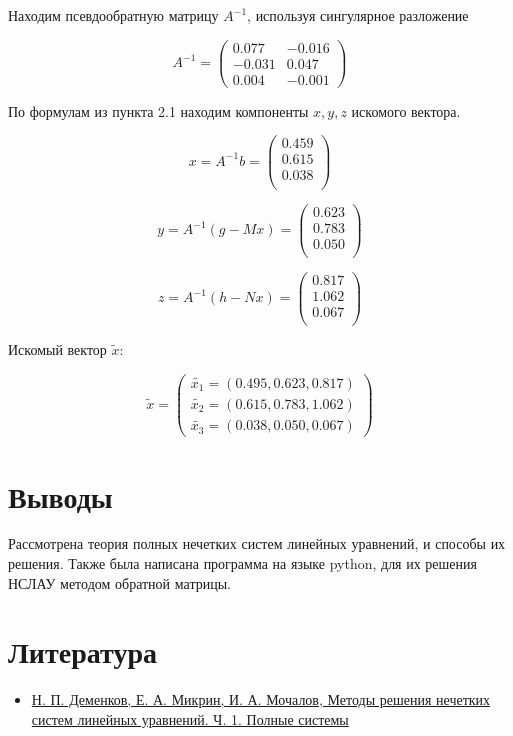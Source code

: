 \documentclass[12pt]{article}
\begin{document}
Находим псевдообратную матрицу $A^{-1}$, используя сингулярное разложение

\[
	A^{-1} = \begin{pmatrix}
		0.077  & -0.016 \\
		-0.031 & 0.047  \\
		0.004  & -0.001
	\end{pmatrix}
\]

По формулам из пункта 2.1 находим компоненты $x, y, z$ искомого вектора.

\[
	x = A^{-1} b = \begin{pmatrix}
		0.459 \\
		0.615 \\
		0.038 \\
	\end{pmatrix}
\]

\[
	y = A^{-1}(g - Mx) = \begin{pmatrix}
		0.623 \\
		0.783 \\
		0.050 \\
	\end{pmatrix}
\]

\[
	z = A^{-1}(h - Nx) = \begin{pmatrix}
		0.817 \\
		1.062 \\
		0.067 \\
	\end{pmatrix}
\]

Искомый вектор $\tilde{x}$:

\[
	\tilde{x} = \begin{pmatrix}
		\tilde{x_1} = (0.495, 0.623, 0.817) \\
		\tilde{x_2} = (0.615, 0.783, 1.062) \\
		\tilde{x_3} = (0.038, 0.050, 0.067)
	\end{pmatrix}
\]





\section{Выводы}
Рассмотрена теория полных нечетких систем линейных уравнений, и способы их
решения. Также была написана программа на языке python, для их решения НСЛАУ
методом обратной матрицы.

\section*{Литература}

\begin{itemize}
	\item \href{https://www.mathnet.ru/links/42a704770b8358acc6305a2c2de4377b/pu1145.pdf}{Н. П. Деменков, Е. А. Микрин, И. А. Мочалов, Методы решения нечетких
		      систем линейных уравнений. Ч. 1. Полные системы}
\end{itemize}
\end{document}
